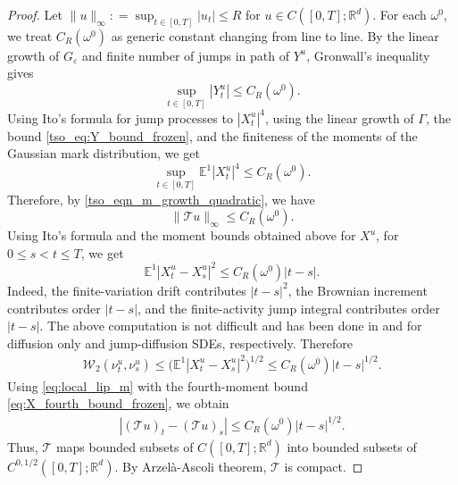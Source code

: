 \documentclass{article}
\def\R{\mathbb{R}}
\newcommand{\E}{\mathbb{E}}
\numberwithin{equation}{section}
\begin{document}
\begin{proof}
Let $\|u\|_\infty: = \sup_{t \in [0,T]} |u_t| \leq R$ for $u \in C([0,T];\R^d)$. For each $\omega^0$, we treat $C_R(\omega^0)$ as generic constant changing from line to line. By the linear growth of $G_\varepsilon$ and finite number of jumps in path of $Y^u$, Gronwall's inequality gives
\begin{equation}
    \sup_{t\in[0,T]}|Y_t^u|
    \le C_R(\omega^0).
    \label{tso_eq:Y_bound_frozen}
\end{equation}
Using Ito's formula for jump processes to $|X_t^u|^4$, using the linear growth of $\Gamma$, the bound \eqref{tso_eq:Y_bound_frozen}, and the finiteness of the moments of the Gaussian mark distribution, we get
\begin{equation}
    \sup_{t\in[0,T]}
    \E^1|X_t^u|^4
    \le
    C_R(\omega^0).
    \label{eq:X_fourth_bound_frozen}
\end{equation}
Therefore, by \eqref{tso_eqn_m_growth_quadratic}, we have
\begin{equation*}
    \| \mathcal T u\|_\infty
    \le C_R(\omega^0).
\end{equation*}
Using Ito's formula and the moment bounds obtained above for $X^u$, for $0\le s<t\le T$, we get
\begin{equation}
    \mathbb E^1|X_t^u-X_s^u|^2
    \leq  C_R(\omega^0)|t-s|.
    \label{eq:X_increment_frozen}
\end{equation}
Indeed, the finite-variation drift contributes $|t-s|^2$, the Brownian increment contributes order $|t-s|$, and the finite-activity jump integral contributes order $|t-s|$. The above computation is not difficult and has been done in \cite{carrillo2018analytical} and \cite{kalise2023consensus} for diffusion only and jump-diffusion SDEs, respectively. Therefore
\begin{align*}
    \mathcal{W}_2(\nu_t^u,\nu_s^u)
    \le
    \bigl(\mathbb E^1|X_t^u-X_s^u|^2\bigr)^{1/2}
    \le
    C_R(\omega^0)|t-s|^{1/2}.
\end{align*}
Using \eqref{eq:local_lip_m} with the fourth-moment bound \eqref{eq:X_fourth_bound_frozen}, we obtain
\begin{align*}
    |(\mathcal T u)_t-(\mathcal T u)_s|
    \le
    C_R(\omega^0)|t-s|^{1/2}.
\end{align*}
Thus, $\mathcal T$ maps bounded subsets of $C([0,T];\mathbb R^d)$ into bounded subsets of
$C^{0,1/2}([0,T];\mathbb R^d)$. By Arzel\`{a}-Ascoli theorem, $\mathcal T$ is compact.


\end{proof}
\end{document}
